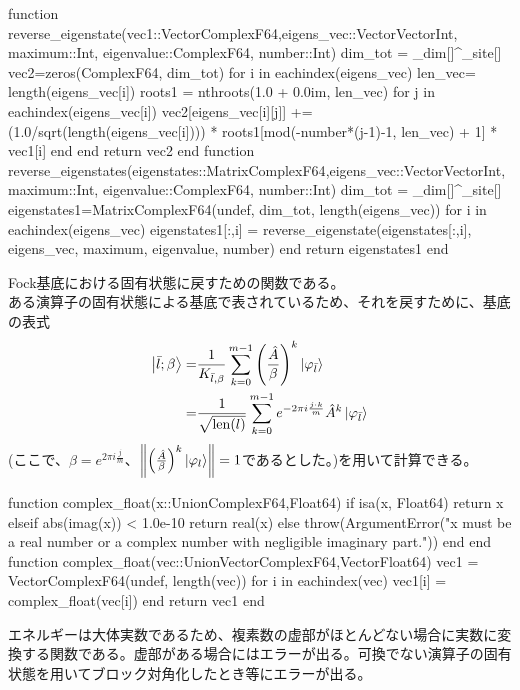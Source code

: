\documentclass{ltjsarticle}
\begin{document}
\begin{jllisting}
function reverse_eigenstate(vec1::Vector{ComplexF64},eigens_vec::Vector{Vector{Int}}, maximum::Int, eigenvalue::ComplexF64, number::Int)
  dim_tot = _dim[]^_site[]
  vec2=zeros(ComplexF64, dim_tot)
  for i in eachindex(eigens_vec)
    len_vec= length(eigens_vec[i])
    roots1 = nthroots(1.0 + 0.0im, len_vec)
    for j in eachindex(eigens_vec[i])
      vec2[eigens_vec[i][j]] += (1.0/sqrt(length(eigens_vec[i]))) * roots1[mod(-number*(j-1)-1, len_vec) + 1] * vec1[i]
    end
  end
  return vec2
end
function reverse_eigenstates(eigenstates::Matrix{ComplexF64},eigens_vec::Vector{Vector{Int}}, maximum::Int, eigenvalue::ComplexF64, number::Int)
  dim_tot = _dim[]^_site[]
  eigenstates1=Matrix{ComplexF64}(undef, dim_tot, length(eigens_vec))
  for i in eachindex(eigens_vec)
    eigenstates1[:,i] = reverse_eigenstate(eigenstates[:,i], eigens_vec, maximum, eigenvalue, number)
  end
  return eigenstates1
end
\end{jllisting}
Fock基底における固有状態に戻すための関数である。\\
ある演算子の固有状態による基底で表されているため、それを戻すために、基底の表式
\begin{align}
  \ket{\bar{l};\beta} =& \frac{1}{K_{\bar{l},\beta}}\sum_{k=0}^{m-1} \left(\frac{\hat{A}}{\beta} \right)^k \ket{\varphi_{\bar{l}}}\\
=&\frac{1}{\sqrt{\mathrm{len}(l)}}\sum_{k=0}^{m-1} e^{-2\pi i\frac{j\cdot k}{m}}\hat{A}^k \ket{\varphi_{\bar{l}}}
\end{align}
(ここで、$\beta=e^{2\pi i\frac{j}{m}}$、$\norm{\left(\frac{\hat{A}}{\beta} \right)^k \ket{\varphi_{l}}}=1$であるとした。)を用いて計算できる。\\
\begin{jllisting}
function complex_float(x::Union{ComplexF64,Float64})
  if isa(x, Float64)
    return x
  elseif abs(imag(x)) < 1.0e-10
    return real(x)
  else
    throw(ArgumentError("x must be a real number or a complex number with negligible imaginary part."))
  end
end
function complex_float(vec::Union{Vector{ComplexF64},Vector{Float64}})
  vec1 = Vector{ComplexF64}(undef, length(vec))
  for i in eachindex(vec)
    vec1[i] = complex_float(vec[i])
  end
  return vec1
end
\end{jllisting}
エネルギーは大体実数であるため、複素数の虚部がほとんどない場合に実数に変換する関数である。虚部がある場合にはエラーが出る。可換でない演算子の固有状態を用いてブロック対角化したとき等にエラーが出る。\\
\end{document}
